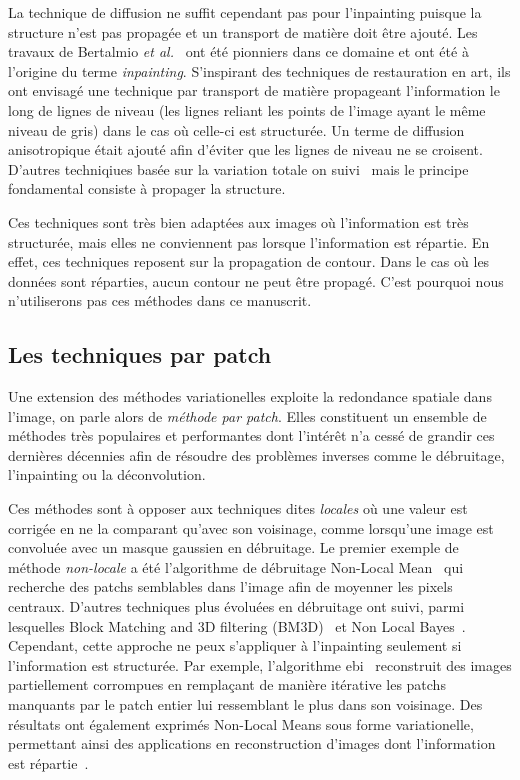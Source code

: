 La technique de diffusion ne suffit cependant pas pour l'inpainting puisque la structure n'est pas propagée et un transport de matière doit être ajouté. Les travaux de Bertalmio \textit{et al.}~\cite{bertalmio2000image} ont été pionniers dans ce domaine et ont été à l'origine du terme \emph{inpainting}. S'inspirant des techniques de restauration en art, ils ont envisagé une technique par transport de matière propageant l'information le long de lignes de niveau (les lignes reliant les points de l'image ayant le même niveau de gris) dans le cas où celle-ci est structurée. Un terme de diffusion anisotropique était ajouté afin d'éviter que les lignes de niveau ne se croisent. D'autres techniqiues basée sur la variation totale on suivi~\cite{shen2002mathematical, chan2001nontexture} mais le principe fondamental consiste à propager la structure.

Ces techniques sont très bien adaptées aux images où l'information est très structurée, mais elles ne conviennent pas lorsque l'information est répartie. En effet, ces techniques reposent sur la propagation de contour. Dans le cas où les données sont réparties, aucun contour ne peut être propagé. C'est pourquoi nous n'utiliserons pas ces méthodes dans ce manuscrit.


\subsection{Les techniques par patch}

Une extension des méthodes variationelles exploite la redondance spatiale dans l'image, on parle alors de \emph{méthode par patch}. Elles constituent un ensemble de méthodes très populaires et performantes dont l'intérêt n'a cessé de grandir ces dernières décennies afin de résoudre des problèmes inverses comme le débruitage, l'inpainting ou la déconvolution.

Ces méthodes sont à opposer aux techniques dites \emph{locales} où une valeur est corrigée en ne la comparant qu'avec son voisinage, comme lorsqu'une image est convoluée avec un masque gaussien en débruitage. Le premier exemple de méthode \emph{non-locale} a été l'algorithme de débruitage Non-Local Mean~\cite{buades2005non} qui recherche des patchs semblables dans l'image afin de moyenner les pixels centraux. D'autres techniques plus évoluées en débruitage ont suivi, parmi lesquelles Block Matching and 3D filtering (BM3D)~\cite{dabov2007image} et Non Local Bayes~\cite{lebrun2013nonlocal}. Cependant, cette approche ne peux s'appliquer à l'inpainting seulement si l'information est structurée. Par exemple, l'algorithme \gls{ebi}~\cite{criminisi2004region} reconstruit des images partiellement corrompues en remplaçant de manière itérative les patchs manquants par le patch entier lui ressemblant le plus dans son voisinage. Des résultats ont également exprimés Non-Local Means sous forme variationelle, permettant ainsi des applications en reconstruction d'images dont l'information est répartie~\cite{peyre2008non, unni2018non, arias2009variational, yang2012nonlocal}.

